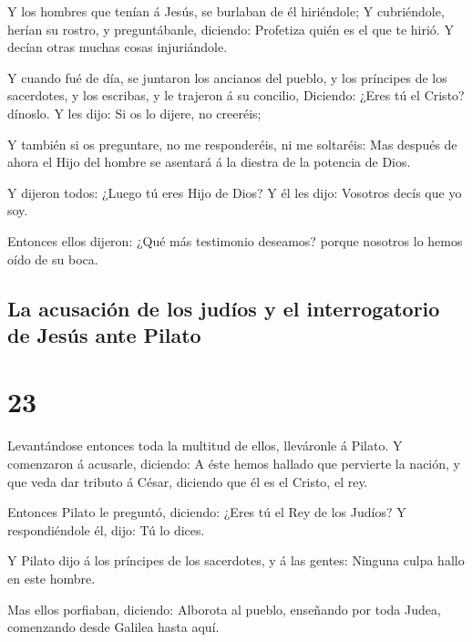  Y los hombres que tenían á Jesús, se burlaban de él
hiriéndole;  Y cubriéndole, herían su rostro, y
preguntábanle, diciendo: Profetiza quién es el que te hirió.
 Y decían otras muchas cosas injuriándole.

 Y cuando fué de día, se juntaron los ancianos del
pueblo, y los príncipes de los sacerdotes, y los escribas, y le trajeron
á su concilio,  Diciendo: ¿Eres tú el Cristo? dínoslo. Y
les dijo: Si os lo dijere, no creeréis;

 Y también si os preguntare, no me responderéis, ni me
soltaréis:  Mas después de ahora el Hijo del hombre se
asentará á la diestra de la potencia de Dios.

 Y dijeron todos: ¿Luego tú eres Hijo de Dios? Y él les
dijo: Vosotros decís que yo soy.

 Entonces ellos dijeron: ¿Qué más testimonio deseamos?
porque nosotros lo hemos oído de su boca.

\hypertarget{la-acusaciuxf3n-de-los-juduxedos-y-el-interrogatorio-de-jesuxfas-ante-pilato}{%
\subsection{La acusación de los judíos y el interrogatorio de Jesús ante
Pilato}\label{la-acusaciuxf3n-de-los-juduxedos-y-el-interrogatorio-de-jesuxfas-ante-pilato}}

\hypertarget{section-42-23}{%
\section{23}\label{section-42-23}}

 Levantándose entonces toda la multitud de ellos,
lleváronle á Pilato.  Y comenzaron á acusarle, diciendo: A
éste hemos hallado que pervierte la nación, y que veda dar tributo á
César, diciendo que él es el Cristo, el rey.

 Entonces Pilato le preguntó, diciendo: ¿Eres tú el Rey de
los Judíos? Y respondiéndole él, dijo: Tú lo dices.

 Y Pilato dijo á los príncipes de los sacerdotes, y á las
gentes: Ninguna culpa hallo en este hombre.

 Mas ellos porfiaban, diciendo: Alborota al pueblo,
enseñando por toda Judea, comenzando desde Galilea hasta aquí.

